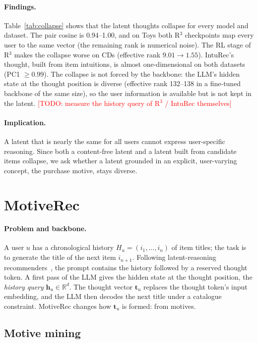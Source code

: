 \documentclass[10pt,twocolumn]{article}
\newcommand{\todo}[1]{\textcolor{red}{[TODO: #1]}}
\newcommand{\thought}{\mathbf{t}}
\begin{document}
\paragraph{Findings.} Table~\ref{tab:collapse} shows that the latent thoughts collapse for every model
and dataset. The pair cosine is 0.94--1.00, and on Toys both R$^3$ checkpoints map every user to the
same vector (the remaining rank is numerical noise). The RL stage of R$^3$ makes the collapse worse on
CDs (effective rank $9.01\to1.55$). IntuRec's thought, built from item intuitions, is almost
one-dimensional on both datasets (PC1 $\geq 0.99$). The collapse is not forced by the backbone: the LLM's hidden state at the thought position is diverse
(effective rank 132--138 in a fine-tuned backbone of the same size), so the user information is available
but is not kept in the latent. \todo{measure the history query of R$^3$ / IntuRec themselves}

\paragraph{Implication.} A latent that is nearly the same for all users cannot express user-specific
reasoning. Since both a content-free latent and a latent built from candidate items collapse, we ask
whether a latent grounded in an explicit, user-varying concept, the purchase motive, stays diverse.

\section{MotiveRec}\label{sec:method}
\paragraph{Problem and backbone.} A user $u$ has a chronological history $H_u=(i_1,\dots,i_n)$ of item
titles; the task is to generate the title of the next item $i_{n+1}$. Following latent-reasoning
recommenders~\citep{r3,inturec}, the prompt contains the history followed by a reserved thought token.
A first pass of the LLM gives the hidden state at the thought position, the \emph{history query}
$\mathbf{h}_u\in\mathbb{R}^d$. The thought vector $\thought_u$ replaces the thought token's input
embedding, and the LLM then decodes the next title under a catalogue constraint. MotiveRec changes how
$\thought_u$ is formed: from motives.

\subsection{Motive mining}\label{sec:mining}
\end{document}
